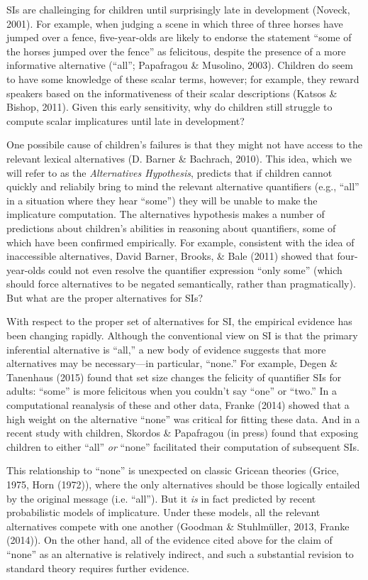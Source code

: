 \documentclass[10pt, letterpaper]{article}
\begin{document}
SIs are challeinging for children until surprisingly late in development
(Noveck, 2001). For example, when judging a scene in which three of
three horses have jumped over a fence, five-year-olds are likely to
endorse the statement ``some of the horses jumped over the fence'' as
felicitous, despite the presence of a more informative alternative
(``all''; Papafragou \& Musolino, 2003). Children do seem to have some
knowledge of these scalar terms, however; for example, they reward
speakers based on the informativeness of their scalar descriptions
(Katsos \& Bishop, 2011). Given this early sensitivity, why do children
still struggle to compute scalar implicatures until late in development?

One possibile cause of children's failures is that they might not have
access to the relevant lexical alternatives (D. Barner \& Bachrach,
2010). This idea, which we will refer to as the \emph{Alternatives
Hypothesis}, predicts that if children cannot quickly and reliabily
bring to mind the relevant alternative quantifiers (e.g., ``all'' in a
situation where they hear ``some'') they will be unable to make the
implicature computation. The alternatives hypothesis makes a number of
predictions about children's abilities in reasoning about quantifiers,
some of which have been confirmed empirically. For example, consistent
with the idea of inaccessible alternatives, David Barner, Brooks, \&
Bale (2011) showed that four-year-olds could not even resolve the
quantifier expression ``only some'' (which should force alternatives to
be negated semantically, rather than pragmatically). But what are the
proper alternatives for SIs?

With respect to the proper set of alternatives for SI, the empirical
evidence has been changing rapidly. Although the conventional view on SI
is that the primary inferential alternative is ``all,'' a new body of
evidence suggests that more alternatives may be necessary---in
particular, ``none.'' For example, Degen \& Tanenhaus (2015) found that
set size changes the felicity of quantifier SIs for adults: ``some'' is
more felicitous when you couldn't say ``one'' or ``two.'' In a
computational reanalysis of these and other data, Franke (2014) showed
that a high weight on the alternative ``none'' was critical for fitting
these data. And in a recent study with children, Skordos \& Papafragou
(in press) found that exposing children to either ``all'' \emph{or}
``none'' facilitated their computation of subsequent SIs.

This relationship to ``none'' is unexpected on classic Gricean theories
(Grice, 1975, Horn (1972)), where the only alternatives should be those
logically entailed by the original message (i.e. ``all''). But it
\emph{is} in fact predicted by recent probabilistic models of
implicature. Under these models, all the relevant alternatives compete
with one another (Goodman \& Stuhlm{ü}ller, 2013, Franke (2014)). On the
other hand, all of the evidence cited above for the claim of ``none'' as
an alternative is relatively indirect, and such a substantial revision
to standard theory requires further evidence.
\end{document}
